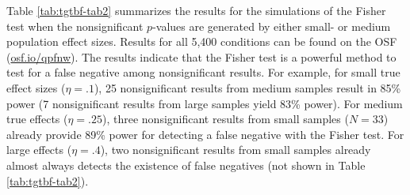 \documentclass[a5paper]{book}
\begin{document}
Table \ref{tab:tgtbf-tab2} summarizes the results for the simulations of
the Fisher test when the nonsignificant \(p\)-values are generated by
either small- or medium population effect sizes. Results for all 5,400
conditions can be found on the OSF
(\href{https://osf.io/qpfnw}{osf.io/qpfnw}). The results indicate that
the Fisher test is a powerful method to test for a false negative among
nonsignificant results. For example, for small true effect sizes
(\(\eta=.1\)), 25 nonsignificant results from medium samples result in
85\% power (7 nonsignificant results from large samples yield 83\%
power). For medium true effects (\(\eta=.25\)), three nonsignificant
results from small samples (\(N=33\)) already provide 89\% power for
detecting a false negative with the Fisher test. For large effects
(\(\eta=.4\)), two nonsignificant results from small samples already
almost always detects the existence of false negatives (not shown in
Table \ref{tab:tgtbf-tab2}).
\end{document}
